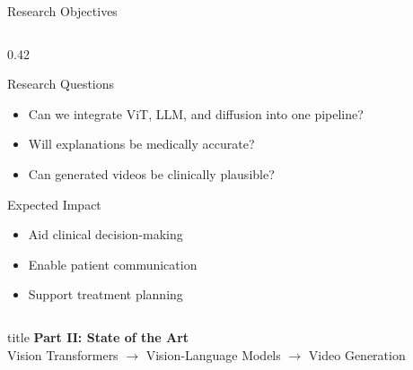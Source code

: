 \documentclass[aspectratio=169,xcolor=dvipsnames]{beamer}
\begin{document}
\begin{frame}{Research Objectives}
\begin{columns}
        \begin{column}{0.42\textwidth}
            \begin{block}{ Research Questions}
                \begin{itemize}
                    \item Can we integrate ViT, LLM, and diffusion into one pipeline?
                    \item Will explanations be medically accurate?
                    \item Can generated videos be clinically plausible?
                \end{itemize}
            \end{block}
            
            \vspace{0.5em}
            
            \begin{block}{ Expected Impact}
                \begin{itemize}
                    \item Aid clinical decision-making
                    \item Enable patient communication
                    \item Support treatment planning
                \end{itemize}
            \end{block}
        \end{column}
    \end{columns}
\end{frame}

\begin{frame}[plain]
    \centering
    \vfill
    \begin{beamercolorbox}[center,shadow=true,rounded=true]{title}
        \textbf{Part II: State of the Art}\\
        \vspace{0.5em}
        \large Vision Transformers $\to$ Vision-Language Models $\to$ Video Generation
    \end{beamercolorbox}
    \vfill
\end{frame}
\end{document}
